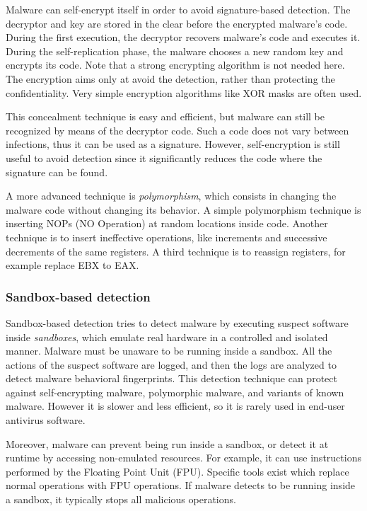 \documentclass[a4paper,12pt]{article}
\begin{document}
Malware can self-encrypt itself in order to avoid signature-based detection. The decryptor and key are stored in the clear before the encrypted malware's code. During the first execution, the decryptor recovers malware's code and executes it. During the self-replication phase, the malware chooses a new random key and encrypts its code.
Note that a strong encrypting algorithm is not needed here. The encryption aims only at avoid the detection, rather than protecting the confidentiality. Very simple encryption algorithms like XOR masks are often used.

This concealment technique is easy and efficient, but malware can still be recognized by means of the decryptor code. Such a code does not vary between infections, thus it can be used as a signature. However, self-encryption is still useful to avoid detection since it significantly reduces the code where the signature can be found.

A more advanced technique is \textit{polymorphism}, which consists in changing the malware code without changing its behavior. A simple polymorphism technique is inserting NOPs (NO Operation) at random locations inside code. Another technique is to insert ineffective operations, like increments and successive decrements of the same registers. A third technique is to reassign registers, for example replace EBX to EAX.

\subsubsection{Sandbox-based detection}
Sandbox-based detection tries to detect malware by executing suspect software inside \textit{sandboxes}, which emulate real hardware in a controlled and isolated manner. Malware must be unaware to be running inside a sandbox. All the actions of the suspect software are logged, and then the logs are analyzed to detect malware behavioral fingerprints. This detection technique can protect against self-encrypting malware, polymorphic malware, and variants of known malware. However it is slower and less efficient, so it is rarely used in end-user antivirus software.

Moreover, malware can prevent being run inside a sandbox, or detect it at runtime by accessing non-emulated resources. For example, it can use instructions performed by the Floating Point Unit (FPU). Specific tools exist which replace normal operations with FPU operations. If malware detects to be running inside a sandbox, it typically stops all malicious operations.
\end{document}
